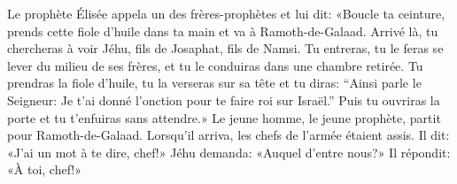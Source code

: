 Le prophète Élisée appela un des frères-prophètes et lui dit:
	«Boucle ta ceinture,
		prends cette fiole d’huile dans ta main et va à Ramoth-de-Galaad.
Arrivé là, tu chercheras à voir Jéhu, fils de Josaphat, fils de Namsi.
Tu entreras, tu le feras se lever du milieu de ses frères,
	et tu le conduiras dans une chambre retirée.
Tu prendras la fiole d’huile, tu la verseras sur sa tête et tu diras:
	“Ainsi parle le Seigneur: Je t’ai donné l’onction pour te faire roi sur Israël.”
	Puis tu ouvriras la porte et tu t’enfuiras sans attendre.»
Le jeune homme, le jeune prophète, partit pour Ramoth-de-Galaad.
Lorsqu’il arriva, les chefs de l’armée étaient assis.
Il dit: «J’ai un mot à te dire, chef!»
	Jéhu demanda: «Auquel d’entre nous?»
	Il répondit: «À toi, chef!»
